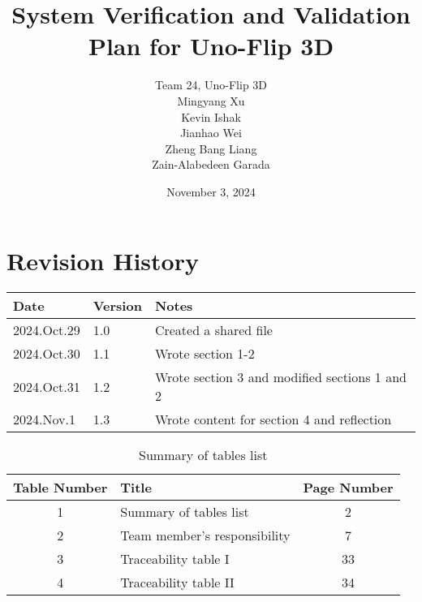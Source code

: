 \documentclass[12pt, titlepage]{article}
\begin{document}
\title{System Verification and Validation Plan for Uno-Flip 3D} 
\author{
    Team 24, Uno-Flip 3D \\[10pt]
    Mingyang Xu \\ 
    Kevin Ishak \\ 
    Jianhao Wei \\ 
    Zheng Bang Liang \\ 
    Zain-Alabedeen Garada
}
\date{November 3, 2024}

\maketitle


\section*{Revision History}

\begin{tabularx}{\textwidth}{p{3cm}p{2cm}X}
\toprule
{\bf Date} & {\bf Version} & {\bf Notes}\\
\midrule
2024.Oct.29 & 1.0 & Created a shared file\\
2024.Oct.30 & 1.1 & Wrote section 1-2\\
2024.Oct.31 & 1.2 & Wrote section 3 and modified sections 1 and 2\\
2024.Nov.1 & 1.3 & Wrote content for section 4 and reflection\\
\bottomrule
\end{tabularx}

\newpage

\tableofcontents
\newpage

\listoftables
\begin{table}[h!]
\centering
\begin{tabular}{|c|l|c|}
\hline
\textbf{Table Number} & \textbf{Title} & \textbf{Page Number} \\ \hline
1 & Summary of tables list & 2 \\ \hline
2 & Team member's responsibility & 7 \\ \hline
3 & Traceability table I & 33 \\ \hline
4 & Traceability table II & 34 \\ \hline
\end{tabular}
\caption{Summary of tables list}
\end{table}

\newpage
\end{document}
